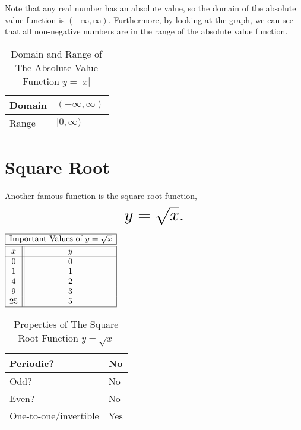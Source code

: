 \documentclass[nooutcomes]{ximera}
\begin{document}
Note that any real number has an absolute value, so the domain of the absolute value function is $(-\infty, \infty)$. Furthermore, by looking at the graph, we can see that all non-negative numbers are in the range of the absolute value function.


\begin{table}[h]
\caption{\label{tab:absdr}Domain and Range of The Absolute Value Function $y = |x|$}
\centering
\begin{tabular}{l|l}
Domain & $(-\infty, \infty)$ \\ \hline
Range & $[0, \infty)$
\end{tabular}
\end{table}

\newpage


\section{Square Root}
Another famous function is the square root function, $$ \mbox{\huge $y=\sqrt{x}.$}$$ 

\begin{image}
\end{image}


\begin{center}
\(
\begin{array}{ |c || c|  }
 \hline
 \multicolumn{2}{|c|}{\text{\normalfont Important Values of } y=\sqrt{x}} \\
\hline
 \hline
 x & y\\
 \hline
 0&0\\
 1&1\\
 4&2\\
 9&3\\
 25&5\\
 \hline
\end{array}
\)
\end{center}

\begin{table}[h]
\caption{\label{tab:sqrtproperties}Properties of The Square Root Function $y = \sqrt{x}$}
\centering
\begin{tabular}{l|l}
Periodic? & No\\ \hline
Odd? &  No \\ \hline
Even? & No \\ \hline
One-to-one/invertible & Yes
\end{tabular}
\end{table}
\end{document}

